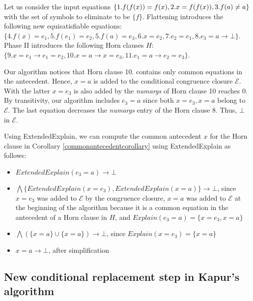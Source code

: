 \begin{example}
  Let us consider the input equations $\{
    1. f(f(x)) = f(x), \\ 2. x = f(f(x)), 
  3. f(a) \neq a\}$ 
  with the 
  set of symbols to eliminate to be 
  $\{ f \}$.
  Flattening introduces the following
  new equisatisfiable equations:
  $\{4. f(x) = e_1, 5. f(e_1) = e_2, 
    5. f(a) = e_3, 6. x = e_2, 7. e_2 = e_1, 
  8. e_3 = a \rightarrow \bot \}$. 
  Phase II introduces the following 
  Horn clauses $H$:
  $\{9. x = e_1 \rightarrow e_1 = e_2,
    10. x = a \rightarrow x = e_3,
    11. e_1 = a \rightarrow e_2 = e_3
  \}$.

  Our algorithm notices that Horn clause 10.
  contains only common equations in the
  antecedent. Hence, $x = a$ is added to the
  conditional congruence closure $\mathcal{E}$.
  With the latter $x = e_3$ is also added by
  the \emph{numargs} of Horn clause 10 reaches
  0. By transitivity, our algorithm
  includes $e_3 = a$ since both $x = e_3,
  x = a$ belong to $\mathcal{E}$.
  The last equation decreases the 
  \emph{numargs} entry of the Horn clause
  8. Thus, $\bot$ in $\mathcal{E}$.

  Using ExtendedExplain, we can compute the
  common antecedent $x$ 
  for the Horn clause in Corollary
  \ref{commonantecedentcorollary} using 
  ExtendedExplain as follows:

  \begin{itemize}
    \item $ExtendedExplain(e_3 = a) \rightarrow \bot$
    \item $\bigwedge \{ExtendedExplain(x = e_3), ExtendedExplain(x = a)\} \rightarrow \bot$, since
      $x = e_3$ was added to
      $\mathcal{E}$ by the congruence closure, $x = a$ was added to 
      $\mathcal{E}$ at the beginning of the algorithm because it is
      a common equation in the antecedent of a Horn clause in $H$,
      and $Explain(e_3 = a) = \{x = e_3, x = a\}$
    \item $\bigwedge(\{x = a\} \cup \{x = a\}) \rightarrow \bot$, 
      since $Explain(x = e_3) = \{x = a\}$
    \item $x = a \rightarrow \bot$, after simplification
  \end{itemize}

\end{example}

\subsection{New conditional replacement
step in Kapur's algorithm}

